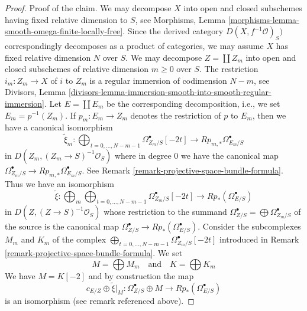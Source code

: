\documentclass[10pt,a4paper]{amsart}
\theoremstyle{plain}
\theoremstyle{definition}
\theoremstyle{remark}
\numberwithin{equation}{subsection}
\begin{document}
\begin{proof}
\medskip\noindent
Proof of the claim. We may decompose $X$ into open and closed subschemes
having fixed relative dimension to $S$, see
Morphisms, Lemma \ref{morphisms-lemma-smooth-omega-finite-locally-free}.
Since the derived category $D(X, f^{-1}\mathcal{O})_S)$ correspondingly
decomposes as a product of categories, we may assume $X$ has
fixed relative dimension $N$ over $S$. We may decompose
$Z = \coprod Z_m$ into open and closed subschemes of relative
dimension $m \geq 0$ over $S$. The restriction $i_m : Z_m \to X$ of
$i$ to $Z_m$ is a regular immersion of codimension $N - m$, see Divisors, Lemma
\ref{divisors-lemma-immersion-smooth-into-smooth-regular-immersion}.
Let $E = \coprod E_m$ be the corresponding decomposition, i.e.,
we set $E_m = p^{-1}(Z_m)$. If $p_m : E_m \to Z_m$ denotes the
restriction of $p$ to $E_m$, then we have a canonical isomorphism
$$
\tilde \xi_m :
\bigoplus\nolimits_{t = 0, \ldots, N - m - 1}
\Omega^\bullet_{Z_m/S}[-2t]
\longrightarrow
Rp_{m, *}\Omega^\bullet_{E_m/S}
$$
in $D(Z_m, (Z_m \to S)^{-1}\mathcal{O}_S)$
where in degree $0$ we have the canonical map
$\Omega^\bullet_{Z_m/S} \to Rp_{m, *}\Omega^\bullet_{E_m/S}$.
See Remark \ref{remark-projective-space-bundle-formula}.
Thus we have an isomorphism
$$
\tilde \xi :
\bigoplus\nolimits_m
\bigoplus\nolimits_{t = 0, \ldots, N - m - 1}
\Omega^\bullet_{Z_m/S}[-2t]
\longrightarrow
Rp_*(\Omega^\bullet_{E/S})
$$
in $D(Z, (Z \to S)^{-1}\mathcal{O}_S)$
whose restriction to the summand
$\Omega^\bullet_{Z/S} = \bigoplus \Omega^\bullet_{Z_m/S}$ of the source
is the canonical map $\Omega^\bullet_{Z/S} \to Rp_*(\Omega^\bullet_{E/S})$.
Consider the subcomplexes $M_m$ and $K_m$ of the complex
$\bigoplus\nolimits_{t = 0, \ldots, N - m - 1} \Omega^\bullet_{Z_m/S}[-2t]$
introduced in Remark \ref{remark-projective-space-bundle-formula}.
We set
$$
M = \bigoplus M_m
\quad\text{and}\quad
K = \bigoplus K_m
$$
We have $M = K[-2]$ and by construction the map
$$
c_{E/Z} \oplus \tilde \xi|_M :
\Omega^\bullet_{Z/S} \oplus M
\longrightarrow
Rp_*(\Omega^\bullet_{E/S})
$$
is an isomorphism (see remark referenced above).


\end{proof}
\end{document}
